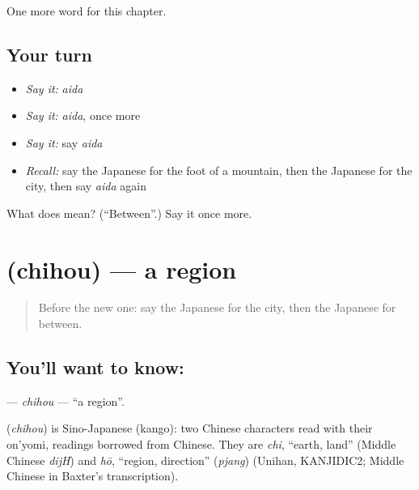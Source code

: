 \begin{grammarlens}[title={What you've built}]
One more word for this chapter.
\end{grammarlens}

\subsection*{Your turn}
\begin{itemize}
\raggedright
  \item \emph{Say it:} \emph{aida}
  \item \emph{Say it:} \emph{aida}, once more
  \item \emph{Say it:} say \emph{aida}
  \item \emph{Recall:} say the Japanese for the foot of a mountain, then the Japanese for the city, then say \emph{aida} again
\end{itemize}

\begin{tcolorbox}[breakable,colback=teal!4,colframe=teal!35!black,title={Before you move on}]
What does  mean? (\textquotedblleft{}Between\textquotedblright{}.) Say it once more.
\end{tcolorbox}
\section[\texorpdfstring{\ja{ちほう} (chihou)}{ちほう (chihou)}]{ (chihou) — a region}

\label{lesson:JA-C81-chihou}



\begin{quote}
Before the new one: say the Japanese for the city, then the Japanese for between.
\end{quote}

\subsection*{You'll want to know: }
\textbf{} — \emph{chihou} — \textquotedblleft{}a region\textquotedblright{}.

\begin{cousinweb}
\textbf{} (\emph{chihou}) is Sino-Japanese (kango): two Chinese characters read with their on'yomi, readings borrowed from Chinese. They are \emph{chi}, \textquotedblleft{}earth, land\textquotedblright{} (Middle Chinese \emph{dijH}) and \emph{hō}, \textquotedblleft{}region, direction\textquotedblright{} (\emph{pjang}) (Unihan, KANJIDIC2; Middle Chinese in Baxter's transcription).
\end{cousinweb}

